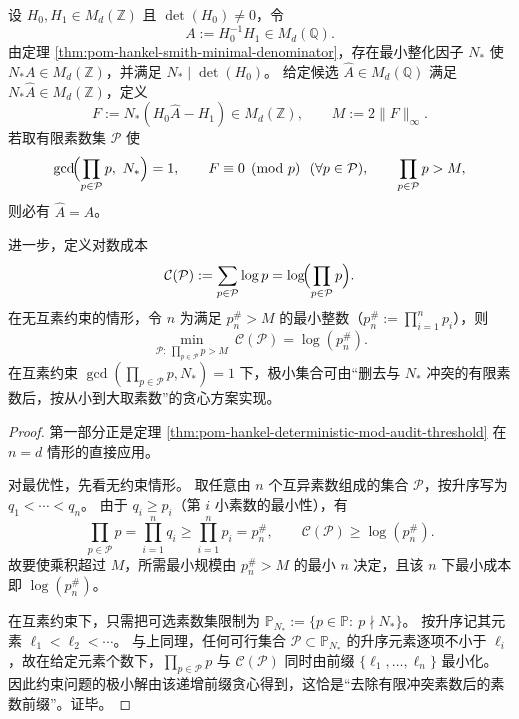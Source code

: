 \begin{theorem}\label{thm:xi-hankel-smith-mod-audit-primorial-optimality}
设 \(H_0,H_1\in M_d(\mathbb Z)\) 且 \(\det(H_0)\neq 0\)，令
\[
A:=H_0^{-1}H_1\in M_d(\mathbb Q).
\]
由定理 \ref{thm:pom-hankel-smith-minimal-denominator}，存在最小整化因子 \(N_\ast\) 使 \(N_\ast A\in M_d(\mathbb Z)\)，并满足 \(N_\ast\mid \det(H_0)\)。
给定候选 \(\widehat A\in M_d(\mathbb Q)\) 满足 \(N_\ast\widehat A\in M_d(\mathbb Z)\)，定义
\[
F:=N_\ast(H_0\widehat A-H_1)\in M_d(\mathbb Z),\qquad M:=2\|F\|_\infty.
\]
若取有限素数集 \(\mathcal P\) 使
\[
\gcd\!\Bigl(\prod_{p\in\mathcal P}p,\ N_\ast\Bigr)=1,\qquad
F\equiv 0\pmod p\ \ (\forall p\in\mathcal P),\qquad
\prod_{p\in\mathcal P}p>M,
\]
则必有 \(\widehat A=A\)。
\par
进一步，定义对数成本
\[
\mathcal C(\mathcal P):=\sum_{p\in\mathcal P}\log p=\log\!\Bigl(\prod_{p\in\mathcal P}p\Bigr).
\]
在无互素约束的情形，令 \(n\) 为满足 \(p_n^\#>M\) 的最小整数（\(p_n^\#:=\prod_{i=1}^{n}p_i\)），则
\[
\min_{\mathcal P:\ \prod_{p\in\mathcal P}p>M}\ \mathcal C(\mathcal P)=\log(p_n^\#).
\]
在互素约束 \(\gcd(\prod_{p\in\mathcal P}p,N_\ast)=1\) 下，极小集合可由“删去与 \(N_\ast\) 冲突的有限素数后，按从小到大取素数”的贪心方案实现。
\end{theorem}
\begin{proof}
第一部分正是定理 \ref{thm:pom-hankel-deterministic-mod-audit-threshold} 在 \(n=d\) 情形的直接应用。
\par
对最优性，先看无约束情形。
取任意由 \(n\) 个互异素数组成的集合 \(\mathcal P\)，按升序写为 \(q_1<\cdots<q_n\)。
由于 \(q_i\ge p_i\)（第 \(i\) 小素数的最小性），有
\[
\prod_{p\in\mathcal P}p=\prod_{i=1}^{n}q_i\ge \prod_{i=1}^{n}p_i=p_n^\#,
\qquad
\mathcal C(\mathcal P)\ge \log(p_n^\#).
\]
故要使乘积超过 \(M\)，所需最小规模由 \(p_n^\#>M\) 的最小 \(n\) 决定，且该 \(n\) 下最小成本即 \(\log(p_n^\#)\)。
\par
在互素约束下，只需把可选素数集限制为
\(
\mathbb P_{N_\ast}:=\{p\in\mathbb P:\ p\nmid N_\ast\}
\)。
按升序记其元素 \(\ell_1<\ell_2<\cdots\)。
与上同理，任何可行集合 \(\mathcal P\subset\mathbb P_{N_\ast}\) 的升序元素逐项不小于 \(\ell_i\)，故在给定元素个数下，\(\prod_{p\in\mathcal P}p\) 与 \(\mathcal C(\mathcal P)\) 同时由前缀 \(\{\ell_1,\dots,\ell_n\}\) 最小化。
因此约束问题的极小解由该递增前缀贪心得到，这恰是“去除有限冲突素数后的素数前缀”。证毕。
\end{proof}

